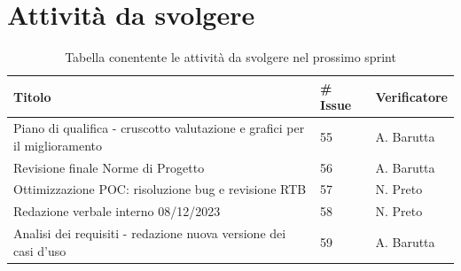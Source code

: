 \documentclass{article}
\begin{document}
\section{Attività da svolgere}
    \begin{table}[H]
        \centering
        \begin{tabular}{|C{7cm}|C{1,5cm}|C{3cm}|}
            \hline
            \textbf{Titolo} & \textbf{\# Issue} & \textbf{Verificatore}\\
            \hline\hline           
            Piano di qualifica - cruscotto valutazione e grafici per il miglioramento  & 55 & A. Barutta\\
            \hline
            Revisione finale Norme di Progetto & 56 & A. Barutta\\
            \hline
            Ottimizzazione POC: risoluzione bug e revisione RTB & 57 & N. Preto\\
            \hline
            Redazione verbale interno 08/12/2023 & 58 & N. Preto\\
            \hline
            Analisi dei requisiti - redazione nuova versione dei casi d'uso & 59 & A. Barutta\\
            \hline
        \end{tabular}
        \caption{Tabella conentente le attività da svolgere nel prossimo sprint}
    \end{table}
\end{document}
